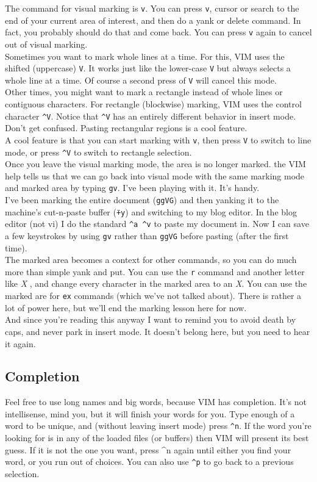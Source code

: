 \documentclass[a4paper, 12pt]{article}
\begin{document}
The command for visual marking is \texttt{v}. You can press \texttt{v}, cursor or search to the end of your current area of interest, and then do a yank or delete command. In fact, you probably should do that and come back. You can press \texttt{v} again to cancel out of visual marking.\\
Sometimes you want to mark whole lines at a time. For this, VIM uses the shifted (uppercase) \texttt{V}. It works just like the lower-case \texttt{V} but always selects a whole line at a time. Of course a second press of \texttt{V} will cancel this mode.\\
Other times, you might want to mark a rectangle instead of whole lines or contiguous characters. For rectangle (blockwise) marking, VIM uses the control character \texttt{\^{}V}. Notice that \texttt{\^{}V} has an entirely different behavior in insert mode. Don't get confused. Pasting rectangular regions is a cool feature.\\
A cool feature is that you can start marking with \texttt{v}, then press \texttt{V} to switch to line mode, or press \texttt{\^{}V} to switch to rectangle selection.\\
Once you leave the visual marking mode, the area is no longer marked. the VIM help tells us that we can go back into visual mode with the same marking mode and marked area by typing \texttt{gv}. I've been playing with it. It's handy.\\
I've been marking the entire document (\texttt{ggVG}) and then yanking it to the machine's cut-n-paste buffer (\texttt{\"{}+y}) and switching to my blog editor. In the blog editor (not vi) I do the standard \texttt{\^{}a \^{}v} to paste my document in. Now I can save a few keystrokes by using \texttt{gv} rather than \texttt{ggVG} before pasting (after the first time).\\
The marked area becomes a context for other commands, so you can do much more than simple yank and put. You can use the \texttt{r} command and another letter like \textit{X} , and change every character in the marked area to an \textit{X}. You can use the marked are for \texttt{ex} commands (which we've not talked about). There is rather a lot of power here, but we'll end the marking lesson here for now.\\
And since you're reading this anyway I want to remind you to avoid death by caps, and never park in insert mode. It doesn't belong here, but you need to hear it again.
\subsection{Completion}
\label{"Completion"}
Feel free to use long names and big words, because VIM has completion. It's not intellisense, mind you, but it will finish your words for you. Type enough of a word to be unique, and (without leaving insert mode) press \texttt{\^{}n}. If the word you're looking for is in any of the loaded files (or buffers) then VIM will present its best guess. If it is not the one you want, press ^n again until either you find your word, or you run out of choices. You can also use \texttt{\^{}p} to go back to a previous selection.
\end{document}
